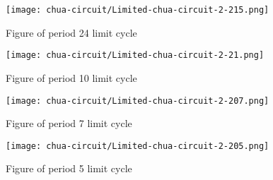 \documentclass[main]{subfiles}
\begin{document}
{%
\setlength{\fboxsep}{0pt}
\setlength{\fboxrule}{1pt}

\hspace*{-0.2\textwidth}
\begin{minipage}{1.3\textwidth}
\begin{figure}[H]
\centering
\texttt{[image: chua-circuit/Limited-chua-circuit-2-215.png]}
\caption[Figure of period 24 limit cycle]{Figure of period 24 limit cycle}
\label{figure:chaotictrajectories}
\end{figure}
\end{minipage}

\hspace*{-0.2\textwidth}
\begin{minipage}{1.3\textwidth}
\begin{figure}[H]
\centering
\texttt{[image: chua-circuit/Limited-chua-circuit-2-21.png]}
\caption[Figure of period 10 limit cycle]{Figure of period 10 limit cycle}
\label{figure:chaotictrajectories}
\end{figure}
\end{minipage}

\hspace*{-0.2\textwidth}
\begin{minipage}{1.3\textwidth}
\begin{figure}[H]
\centering
\texttt{[image: chua-circuit/Limited-chua-circuit-2-207.png]}
\caption[Figure of period 7 limit cycle]{Figure of period 7 limit cycle}
\label{figure:chaotictrajectories}
\end{figure}
\end{minipage}

\hspace*{-0.2\textwidth}
\begin{minipage}{1.3\textwidth}
\begin{figure}[H]
\centering
\texttt{[image: chua-circuit/Limited-chua-circuit-2-205.png]}
\caption[Figure of period 5 limit cycle]{Figure of period 5 limit cycle}
\label{figure:chaotictrajectories}
\end{figure}
\end{minipage}

}
\end{document}
